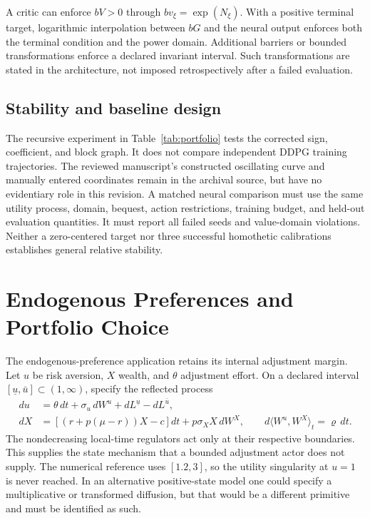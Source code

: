 A critic can enforce $bV>0$ through $b v_\xi=\exp(N_\xi)$. With a positive terminal target, logarithmic interpolation between $bG$ and the neural output enforces both the terminal condition and the power domain. Additional barriers or bounded transformations enforce a declared invariant interval. Such transformations are stated in the architecture, not imposed retrospectively after a failed evaluation.

\subsection{Stability and baseline design}
The recursive experiment in Table~\ref{tab:portfolio} tests the corrected sign, coefficient, and block graph. It does not compare independent DDPG training trajectories. The reviewed manuscript's constructed oscillating curve and manually entered coordinates remain in the archival source, but have no evidentiary role in this revision. A matched neural comparison must use the same utility process, domain, bequest, action restrictions, training budget, and held-out evaluation quantities. It must report all failed seeds and value-domain violations. Neither a zero-centered target nor three successful homothetic calibrations establishes general relative stability.

\section{Endogenous Preferences and Portfolio Choice}\label{sec:ndu}
The endogenous-preference application retains its internal adjustment margin. Let $u$ be risk aversion, $X$ wealth, and $\theta$ adjustment effort. On a declared interval $[\underline u,\bar u]\subset(1,\infty)$, specify the reflected process
\begin{align}
 du&=\theta\,dt+\sigma_u\,dW^u+dL^{\underline u}-dL^{\bar u},\label{eq:ndustate}\\
 dX&=[(r+p(\mu-r))X-c]dt+p\sigma_X X\,dW^X,
 \qquad d\langle W^u,W^X\rangle_t=\varrho\,dt.
\end{align}
The nondecreasing local-time regulators act only at their respective boundaries. This supplies the state mechanism that a bounded adjustment actor does not supply. The numerical reference uses $[1.2,3]$, so the utility singularity at $u=1$ is never reached. In an alternative positive-state model one could specify a multiplicative or transformed diffusion, but that would be a different primitive and must be identified as such.

